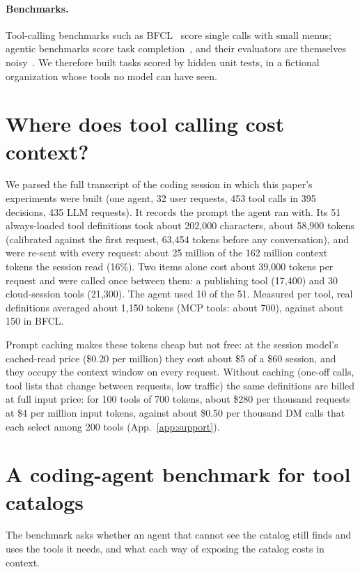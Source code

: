 \paragraph{Benchmarks.} Tool-calling benchmarks such as BFCL~\citep{patil2025bfcl} score single calls with small
menus; agentic benchmarks score task completion~\citep{yao2024taubench,mcpatlas2026,toolathlon2025}, and their
evaluators are themselves noisy~\citep{audit2026}. We therefore built tasks scored by hidden unit tests, in a
fictional organization whose tools no model can have seen.

\section{Where does tool calling cost context?}\label{sec:overhead}
We parsed the full transcript of the coding session in which this paper's experiments were built (one agent,
32 user requests, 453 tool calls in 395 decisions, 435 LLM requests). It records the prompt the agent ran
with. Its 51 always-loaded tool definitions took about
202{,}000 characters, about 58{,}900 tokens (calibrated against the first request, 63{,}454 tokens before
any conversation), and were re-sent with every request: about 25 million of the 162 million context
tokens the session read (16\%). Two items alone cost about 39{,}000 tokens per request and were called once between them: a publishing tool (17{,}400) and 30 cloud-session tools (21{,}300). The agent used 10 of the
51. Measured per tool, real definitions averaged about 1{,}150 tokens (MCP tools: about 700), against about
150 in BFCL.

Prompt caching makes these tokens cheap but not free: at the session model's cached-read price (\$0.20 per
million) they cost about \$5 of a \$60 session, and they occupy the context window on every request. Without
caching (one-off calls, tool lists that change between requests, low traffic) the same definitions are billed
at full input price: for 100 tools of 700 tokens, about \$280 per thousand requests at \$4 per million input
tokens, against about \$0.50 per thousand DM calls that each select among 200 tools (App.~\ref{app:support}).

\section{A coding-agent benchmark for tool catalogs}\label{sec:bench}
The benchmark asks whether an agent that cannot see the catalog still finds and uses the tools it needs, and
what each way of exposing the catalog costs in context.

